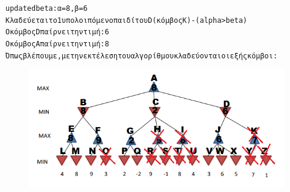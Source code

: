 \documentclass{article}
\begin{document}
\begin{alltt}
  \textlatin{updated beta}: α=8, β=6
  Κλαδεύεται το 1 υπολοιπόμενο παιδί του \textlatin{D} (κόμβος \textlatin{K}) - (\textlatin{alpha>beta})
  Ο κόμβος \textlatin{D} παίρνει την τιμή: 6
Ο κόμβος \textlatin{A} παίρνει την τιμή: 8
\pagebreak
Όπως βλέπουμε, με την εκτέλεση του αλγορίθμου κλαδεύονται οι εξής κόμβοι:
\begin{figure}[h]
    \centering
    \includegraphics[width=1\linewidth]{image4.png}
\end{figure}
\end{alltt}
\end{document}
